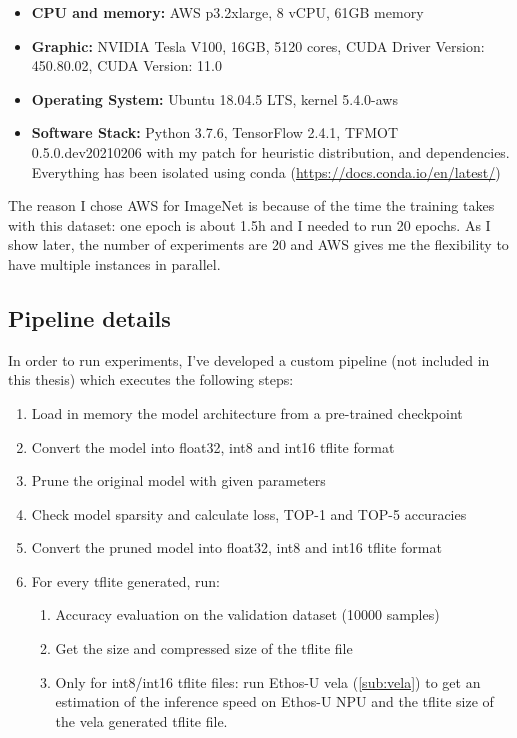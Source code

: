 \begin{itemize}
    \item \textbf{CPU and memory:} AWS p3.2xlarge, 8 vCPU, 61GB memory
    \item \textbf{Graphic:} NVIDIA Tesla V100, 16GB, 5120 cores, CUDA Driver
        Version: 450.80.02, CUDA Version: 11.0
    \item \textbf{Operating System:} Ubuntu 18.04.5 LTS, kernel
        5.4.0-aws
    \item \textbf{Software Stack:} Python 3.7.6, TensorFlow 2.4.1, TFMOT
        0.5.0.dev20210206 with my patch for heuristic distribution, and
        dependencies. Everything has been isolated using conda
        (\url{https://docs.conda.io/en/latest/})
\end{itemize}

The reason I chose AWS for ImageNet is because of the time the training takes
with this dataset: one epoch is about 1.5h and I needed to run 20 epochs.
As I show later, the number of experiments are 20 and AWS gives me the
flexibility to have multiple instances in parallel.

\subsection{Pipeline details}
In order to run experiments, I've developed a custom pipeline (not included in
this thesis) which executes the following steps:

\begin{enumerate}
    \item Load in memory the model architecture from a pre-trained checkpoint
    \item Convert the model into float32, int8 and int16 tflite format
    \item Prune the original model with given parameters
    \item Check model sparsity and calculate loss, TOP-1 and TOP-5 accuracies
    \item Convert the pruned model into float32, int8 and int16 tflite format
    \item For every tflite generated, run:
    \begin{enumerate}
        \item Accuracy evaluation on the validation dataset (10000 samples)
        \item Get the size and compressed size of the tflite file
        \item Only for int8/int16 tflite files: run Ethos-U vela
            (\autoref{sub:vela}) to get an estimation of the inference speed on
            Ethos-U NPU and the tflite size of the vela generated tflite file.
    \end{enumerate}
\end{enumerate}

